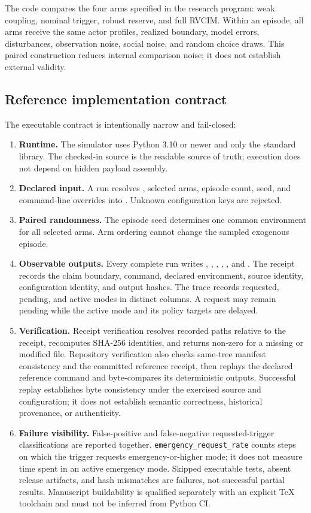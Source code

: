 \documentclass[11pt,a4paper]{article}
\numberwithin{equation}{section}
\theoremstyle{definition}
\theoremstyle{plain}
\theoremstyle{remark}
\newcommand{\RVCIM}{\textsc{RVCIM}}
\begin{document}
The code compares the four arms specified in the research program: weak coupling, nominal trigger, robust reserve, and full \RVCIM. Within an episode, all arms receive the same actor profiles, realized boundary, model errors, disturbances, observation noise, social noise, and random choice draws. This paired construction reduces internal comparison noise; it does not establish external validity.

\subsection{Reference implementation contract}

The executable contract is intentionally narrow and fail-closed:
\begin{enumerate}
  \item \textbf{Runtime.} The simulator uses Python 3.10 or newer and only the standard library. The checked-in source is the readable source of truth; execution does not depend on hidden payload assembly.
  \item \textbf{Declared input.} A run resolves , selected arms, episode count, seed, and command-line overrides into . Unknown configuration keys are rejected.
  \item \textbf{Paired randomness.} The episode seed determines one common environment for all selected arms. Arm ordering cannot change the sampled exogenous episode.
  \item \textbf{Observable outputs.} Every complete run writes , , , , , and . The receipt records the claim boundary, command, declared environment, source identity, configuration identity, and output hashes. The trace records requested, pending, and active modes in distinct columns. A request may remain pending while the active mode and its policy targets are delayed.
  \item \textbf{Verification.} Receipt verification resolves recorded paths relative to the receipt, recomputes SHA-256 identities, and returns non-zero for a missing or modified file. Repository verification also checks same-tree manifest consistency and the committed reference receipt, then replays the declared reference command and byte-compares its deterministic outputs. Successful replay establishes byte consistency under the exercised source and configuration; it does not establish semantic correctness, historical provenance, or authenticity.
  \item \textbf{Failure visibility.} False-positive and false-negative requested-trigger classifications are reported together. \texttt{emergency\_request\_rate} counts steps on which the trigger requests emergency-or-higher mode; it does not measure time spent in an active emergency mode. Skipped executable tests, absent release artifacts, and hash mismatches are failures, not successful partial results. Manuscript buildability is qualified separately with an explicit TeX toolchain and must not be inferred from Python CI.
\end{enumerate}
\end{document}
